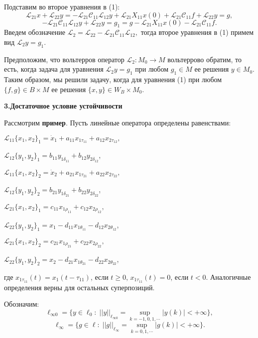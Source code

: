 Подставим во второе уравнения в (1):
$${\mathcal L}_{21} x+{\mathcal L}_{22} y =
-{\mathcal L}_{21} {\mathcal C}_{11} {\mathcal L}_{12} y+{\mathcal L}_{21} X_{11} x(0)+{\mathcal L}_{21} {\mathcal C}_{11} f+{\mathcal L}_{22} y=g,
$$
$$
- {\mathcal L}_{21} {\mathcal C}_{11} {\mathcal L}_{12} y+{\mathcal L}_{22} y=g_{1} =g- {\mathcal L}_{21} X_{11} x(0)-{\mathcal L}_{21} {\mathcal C}_{11} f.
$$
Введем обозначение ${\mathcal L}_2= {\mathcal L}_{22} -{\mathcal L}_{21} {\mathcal C}_{11} {\mathcal L}_{12} ,$ тогда второе уравнения в (1) примем вид ${\mathcal L}_2y=g_{1} .$

Предположим, что вольтерров оператор ${\mathcal L}_2:M_{0} \to M$ вольтеррово обратим, то есть, когда задача для уравнения ${\mathcal L}_2 y=g_{1} $ при любом $g_{1} \in M$ ее решения $y\in M_{0} .$ Таким образом, мы решили задачу, когда для уравнения (1) при любом $\{ f,g\} \in B\times M $ ее решения $\{ x,y\} \in W_{B}\times M_{0} .$


\smallskip \centerline{\bf 3.Достаточное условие устойчивости} \nopagebreak

Рассмотрим {\bf пример}. Пусть линейные оператора определены равенствами:

${\mathcal L}_{11}\{x_1,x_2\}_1 = \dot{x}_1 +
a_{11}x_{1\tau_{11}} + a_{12}x_{2\tau_{12}},$

${\mathcal L}_{12}\{y_1,y_2\}_1 =  b_{11}y_{1\delta_{11}} + b_{12}y_{2\delta_{12}}$,


${\mathcal L}_{11}\{x_1,x_2\}_2 = \dot{x}_2 +
a_{21}x_{1\tau_{21}} + a_{22}x_{2\tau_{22}},$

${\mathcal L}_{12}\{y_1,y_2\}_2 =  b_{21}y_{1\delta_{21}} + b_{22}y_{2\delta_{22}}$,


${\mathcal L}_{21}\{x_1,x_2\}_1 =  c_{11}x_{1\rho_{11}} +
c_{12}x_{2\rho_{12}},$

${\mathcal L}_{22}\{y_1,y_2\}_1 = x_1 - d_{11}x_{1\theta_{11}} - d_{12}x_{2\theta_{12}}$,

${\mathcal L}_{21}\{x_1,x_2\}_2 =  c_{21}x_{1\rho_{21}} +
c_{22}x_{2\rho_{22}},$

${\mathcal L}_{22}\{y_1,y_2\}_2 = x_2 - d_{21}x_{1\theta_{21}} - d_{22}x_{2\theta_{22}}$,

\noindent где $x_{1\tau_{11}}(t)=x_1(t-\tau_{11})$, если $t \geq 0$, $x_{1\tau_{11}}(t)=0$, если $t < 0$. Аналогичные определения верны
для остальных суперпозиций.

Обозначим:
$$
\ell_{\infty 0} =\{y\in \ell_{0}: \; ||y||_{\ell_{\infty 0}}  = \mathop{\sup}\limits_{k=-1,0,1,\cdots} |y(k)| <+\infty \},
$$
$$
\ell_{\infty} =\{g\in \ell: \; ||g||_{\ell_{\infty}}  = \mathop{\sup}\limits_{k=0,1,\cdots} |g(k)| <+\infty \}.
$$

